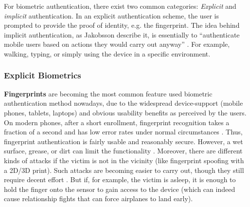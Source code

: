 	For biometric authentication, there exist two common categories: \textit{Explicit} and \textit{implicit} authentication. In an explicit authentication scheme, the user is prompted to provide the proof of identity, e.g. the fingerprint. The idea behind implicit authentication, as Jakobsson \etal describe it, is essentially to ``authenticate mobile users based on actions they would carry out anyway'' \cite{Jakobsson2009ImplicitAuthentication}. For example, walking, typing, or simply using the device in a specific environment.
	
	\subsubsection{Explicit Biometrics}
	\textbf{Fingerprints} are becoming the most common feature used biometric authentication method nowadays, due to the widespread device-support (mobile phones, tablets, laptops) and obvious usability benefits as perceived by the users\cite{Wash2010FolkModels}. On modern phones, after a short enrollment, fingerprint recognition takes a fraction of a second and has low error rates under normal circumstances \cite{Henniger2016SecurityEvaluationFingerprint}. 
	Thus, fingerprint authentication is fairly usable and reasonably secure. However, a wet surface, grease, or dirt can limit the functionality \cite{Bhagavatula2015BiometricPerceptions}. 
	Moreover, there are different kinds of attacks if the victim is not in the vicinity (like fingerprint spoofing with a 2D/3D print). Such attacks are becoming easier to carry out, though they still require decent effort \cite{Marasco2014SurveyAntispoofing}. But if, for example, the victim is asleep, it is enough to hold the finger onto the sensor to gain access to the device (which can indeed cause relationship fights that can force airplanes to land early).
	
